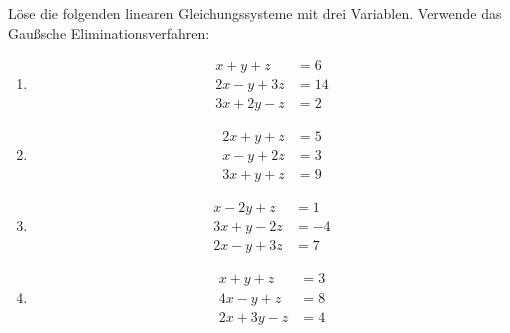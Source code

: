 Löse die folgenden linearen Gleichungssysteme mit drei Variablen. Verwende das Gaußsche Eliminationsverfahren:

\begin{enumerate}[1)]
    \item 
    \[
    \begin{aligned}
        x + y + z &= 6 \\
        2x - y + 3z &= 14 \\
        3x + 2y - z &= 2
    \end{aligned}
    \]
    
    \item 
    \[
    \begin{aligned}
        2x + y + z &= 5 \\
        x - y + 2z &= 3 \\
        3x + y + z &= 9
    \end{aligned}
    \]
    
    \item 
    \[
    \begin{aligned}
        x - 2y + z &= 1 \\
        3x + y - 2z &= -4 \\
        2x - y + 3z &= 7
    \end{aligned}
    \]
    
    \item 
    \[
    \begin{aligned}
        x + y + z &= 3 \\
        4x - y + z &= 8 \\
        2x + 3y - z &= 4
    \end{aligned}
    \]
\end{enumerate}